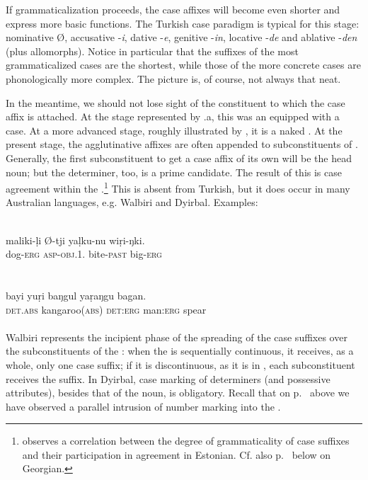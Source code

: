 If grammaticalization proceeds, the case affixes will become even shorter and express more basic functions. The Turkish case paradigm is typical for this stage: nominative Ø, accusative -\textit{i}, dative -\textit{e}, genitive -\textit{in}, locative -\textit{de} and ablative -\textit{den} (plus allomorphs). Notice in particular that the suffixes of the most grammaticalized cases are the shortest, while those of the more concrete cases are phonologically more complex. The picture is, of course, not always that neat.

In the meantime, we should not lose sight of the constituent to which the case affix is attached. At the stage represented by .a, this was an \np equipped with a case. At a more advanced stage, roughly illustrated by , it is a naked \np. At the present stage, the agglutinative affixes are often appended to subconstituents of \nps. Generally, the first subconstituent to get a case affix of its own will be the head noun; but the determiner, too, is a prime candidate. The result of this is case agreement within the \np.\footnote{\citet[117]{Kahr1976} observes a correlation between the degree of grammaticality of case suffixes and their participation in agreement in Estonian. Cf. also p.~\pageref{page101}\chkfn%
 below on Georgian.} This is absent from Turkish, but it does occur in many Australian languages, e.g. Walbiri and Dyirbal. Examples:

\ea\label{ex:E59}
\\
\gll   maliki-\d{l}i  Ø-tji  ya\d{l}ku-nu  wi\d{r}i-ŋki.\\
 dog-\textsc{erg}  {\textsc{asp}-\textsc{obj}.1.\glsg}  bite-\textsc{past}  big-\textsc{erg}\\
\\
\z
\noindent \ea\label{ex:E60}
\\
\gll bayi  yu\d{r}i  baŋgul  ya\d{r}aŋgu  bagan.\\
 \textsc{det}.\textsc{abs}  kangaroo(\textsc{abs})  \textsc{det}:\textsc{erg}  man:\textsc{erg}  spear\\
\\
\z
\noindent Walbiri represents the incipient phase of the spreading of the case suffixes over the subconstituents of the \np: when the \np is sequentially continuous, it receives, as a whole, only one case suffix; if it is discontinuous, as it is in , each subconstituent receives the suffix.\label{page92} In Dyirbal, case marking of determiners (and possessive attributes), besides that of the noun, is obligatory. Recall that on p.~\pageref{page63}\chk%
  above we have observed a parallel intrusion of number marking into the \np.

